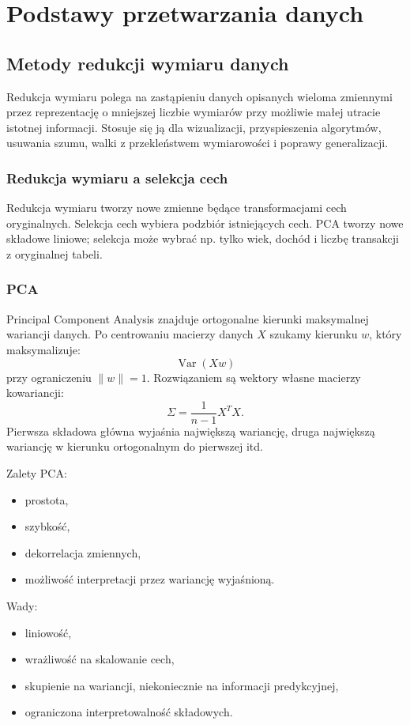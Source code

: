 \section{Podstawy przetwarzania danych}

\subsection{Metody redukcji wymiaru danych}

Redukcja wymiaru polega na zastąpieniu danych opisanych wieloma zmiennymi przez reprezentację o mniejszej liczbie wymiarów przy możliwie małej utracie istotnej informacji. Stosuje się ją dla wizualizacji, przyspieszenia algorytmów, usuwania szumu, walki z przekleństwem wymiarowości i poprawy generalizacji.

\subsubsection{Redukcja wymiaru a selekcja cech}

Redukcja wymiaru tworzy nowe zmienne będące transformacjami cech oryginalnych. Selekcja cech wybiera podzbiór istniejących cech. PCA tworzy nowe składowe liniowe; selekcja może wybrać np. tylko wiek, dochód i liczbę transakcji z oryginalnej tabeli.

\subsubsection{PCA}

Principal Component Analysis znajduje ortogonalne kierunki maksymalnej wariancji danych. Po centrowaniu macierzy danych $X$ szukamy kierunku $w$, który maksymalizuje:
\[
\operatorname{Var}(Xw)
\]
przy ograniczeniu $\|w\|=1$. Rozwiązaniem są wektory własne macierzy kowariancji:
\[
\Sigma=\frac{1}{n-1}X^TX.
\]
Pierwsza składowa główna wyjaśnia największą wariancję, druga największą wariancję w kierunku ortogonalnym do pierwszej itd.

Zalety PCA:
\begin{itemize}
  \item prostota,
  \item szybkość,
  \item dekorrelacja zmiennych,
  \item możliwość interpretacji przez wariancję wyjaśnioną.
\end{itemize}
Wady:
\begin{itemize}
  \item liniowość,
  \item wrażliwość na skalowanie cech,
  \item skupienie na wariancji, niekoniecznie na informacji predykcyjnej,
  \item ograniczona interpretowalność składowych.
\end{itemize}

